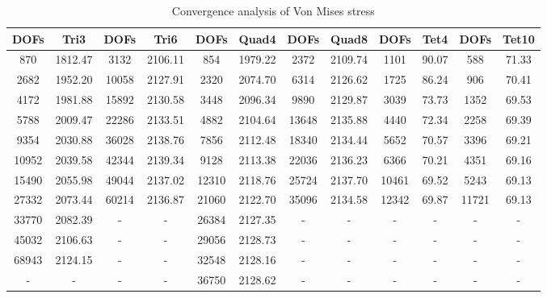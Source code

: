 \begin{table}[ht]
	\caption{Convergence analysis of Von Mises stress} \label{tab: 2DConvergence}
	\begin{tabular}{ c | c | c | c | c | c | c | c | c| c |c |c } 	
		DOFs & Tri3 & DOFs & Tri6 & DOFs & Quad4 & DOFs & Quad8 &DOFs&Tet4&DOFs&Tet10 \\ \hline
		870 & 1812.47 & 3132 & 2106.11 & 854 & 1979.22& 2372  & 2109.74 &1101&90.07&588&71.33 \\ 
		2682 & 1952.20 & 10058 & 2127.91 & 2320 & 2074.70&6314 & 2126.62&1725 & 86.24 & 906 & 70.41\\
		4172 & 1981.88 & 15892 &2130.58 & 3448 & 2096.34&  9890 & 2129.87& 3039 & 73.73 & 1352 & 69.53\\
		5788 & 2009.47 &  22286 &2133.51 & 4882& 2104.64 &13648 & 2135.88&4440 & 72.34 &  2258 &  69.39\\
		9354 & 2030.88 &  36028 &2138.76 & 7856 & 2112.48&18340 & 2134.44&5652 & 70.57 &  3396 & 69.21\\
		10952 & 2039.58 &  42344 &2139.34&  9128 & 2113.38&22036 & 2136.23 &6366 & 70.21 &  4351 & 69.16 \\
		15490 & 2055.98 &   49044 &2137.02&  12310 & 2118.76&25724 & 2137.70& 10461 & 69.52 & 5243 & 69.13\\
		27332 & 2073.44 & 60214 &2136.87& 21060 & 2122.70&35096 & 2134.58 & 12342& 69.87& 11721&  69.13\\
		33770 &  2082.39& - & -  & 26384&2127.35&-&-&-&-&-&-\\
		45032 & 2106.63 & - & - & 29056&2128.73&-&-&-&-&-&-\\
		68943 & 2124.15 & - & - &  32548& 2128.16&-&-&-&-&-&-\\
		- & - & - & - &  36750& 2128.62&-&-&-&-&-&-\\
		\hline  
	\end{tabular}
\end{table}


